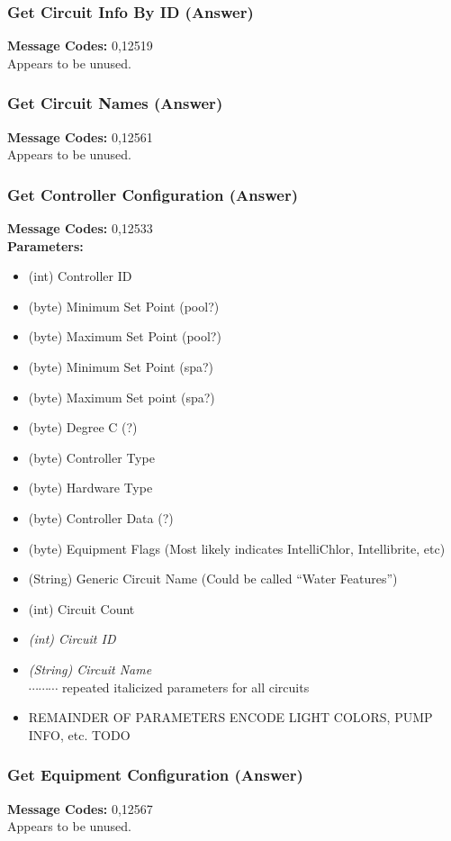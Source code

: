 \documentclass[11pt]{article}
\begin{document}
\subsubsection{Get Circuit Info By ID (Answer)}
\label{msg:12519}
{\bf Message Codes: } 0,12519\\
Appears to be unused.

\subsubsection{Get Circuit Names (Answer)}
\label{msg:12561}
{\bf Message Codes: } 0,12561\\
Appears to be unused.

\subsubsection{Get Controller Configuration (Answer)}
\label{msg:12533}
{\bf Message Codes: } 0,12533\\
{\bf Parameters: }
\small
\begin{itemize}
\item (int) Controller ID
\item (byte) Minimum Set Point (pool?)
\item (byte) Maximum Set Point (pool?)
\item (byte) Minimum Set Point (spa?)
\item (byte) Maximum Set point (spa?)
\item (byte) Degree C (?)
\item (byte) Controller Type
\item (byte) Hardware Type
\item (byte) Controller Data (?)
\item (byte) Equipment Flags (Most likely indicates IntelliChlor, Intellibrite, etc)
\item (String) Generic Circuit Name (Could be called ``Water Features'')
\item (int) Circuit Count
\item {\it (int) Circuit ID}
\item {\it (String) Circuit Name}\\
$\cdots\cdots\cdots$ repeated italicized parameters for all circuits
\item {\color{red} REMAINDER OF PARAMETERS ENCODE LIGHT COLORS, PUMP INFO, etc. TODO}
\end{itemize}
\normalsize

\subsubsection{Get Equipment Configuration (Answer)}
\label{msg:12567}
{\bf Message Codes: } 0,12567\\
Appears to be unused.
\end{document}
